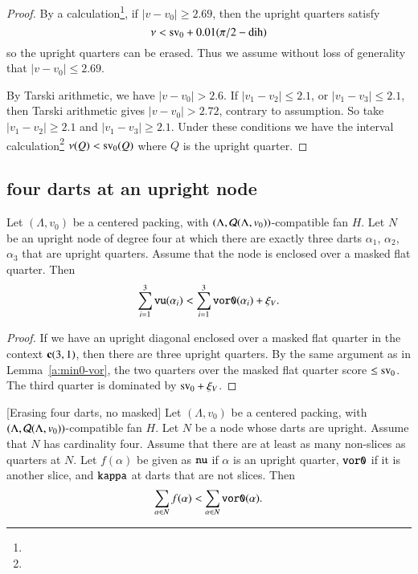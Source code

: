 \begin{proof}
By a calculation\footnote{}, if $|v-v_0|\ge 2.69$,
then the upright quarters satisfy
    $$\nu < {\operatorname{sv}}_0 + 0.01 (\pi/2-\operatorname{dih})$$
so the upright quarters can be erased.  Thus we assume without
loss of generality that $|v-v_0|\le 2.69$.

By Tarski arithmetic, we have $|v-v_0|>2.6$.
If $|v_1-v_2|\le 2.1$,  or $|v_1-v_3|\le 2.1$, then
Tarski arithmetic gives $|v-v_0|>2.72$, 
 contrary to assumption.  So take $|v_1-v_2|\ge 2.1$ and
$|v_1-v_3|\ge2.1$. Under these conditions we have the interval
calculation\footnote{} %
  $\nu(Q) < {\operatorname{sv}}_0(Q)$ where $Q$ is the upright quarter.
\end{proof}


\subsection{four darts at an upright node}


\begin{lemma}
\label{remark:3rd-quarter} 
Let $(\Lambda,v_0)$ be a centered packing, 
with $(\Lambda,{\mathcal Q}(\Lambda,v_0))$-compatible fan $H$.
Let $N$ be an upright node of degree four at which there are
exactly three darts $\alpha_1$, $\alpha_2$, $\alpha_3$
that are upright quarters.  Assume that the node is enclosed
over a masked flat quarter.  
Then
 $$
 \sum_{i=1}^3{\operatorname{{\texttt{vu}}}}(\alpha_i) <
     \sum_{i=1}^3{\operatorname{{\texttt{vor0}}}}(\alpha_i) + \xi_V.
 $$
\end{lemma}

\begin{proof}
 If we have an upright diagonal enclosed
over a masked flat quarter in the context ${\operatorname{\bf c}}{(3,1)}$, then there are
three upright quarters.  By the same argument as in Lemma~\ref{a:min0-vor}, 
the two quarters over the masked flat quarter score $\le{\operatorname{sv}}_0$. The
third quarter is dominated by ${\operatorname{sv}}_0 + \xi_V$.
\end{proof}


\begin{lemma}[Erasing four darts, no masked]
Let $(\Lambda,v_0)$ be a centered packing, 
with $(\Lambda,{\mathcal Q}(\Lambda,v_0))$-compatible fan $H$.
Let $N$ be a node
whose darts are upright.  Assume that $N$ has cardinality four.
Assume that there are at least as many non-slices as quarters at $N$.
Let $f(\alpha)$ be given as ${\operatorname{{\texttt{nu}}}}$ if $\alpha$ is an upright
quarter, ${\operatorname{{\texttt{vor0}}}}$ if it is another slice, and
${\operatorname{{\texttt{kappa}}}}$ at darts that are not slices.  Then
  $$
  \sum_{\alpha\in N} f(\alpha) < \sum_{\alpha\in N} {\operatorname{{\texttt{vor0}}}}(\alpha).
  $$
\end{lemma}

